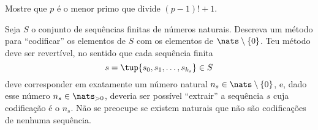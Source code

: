 \begin{exercise}
    Mostre que $p$ \'e o menor primo que divide $(p-1)!+1$.
\end{exercise}

\begin{exercise}
    Seja $S$ o conjunto de sequ\^encias finitas de n\'umeros naturais. Descreva
    um m\'etodo para ``codificar'' os elementos de $S$ com os elementos de
    $\nats\setminus\{0\}$. Teu m\'etodo deve ser revert\'ivel, no sentido que
    cada sequ\^encia finita
    $$
    s = \tup{s_0,s_1,\dots,s_{k_s}} \in S
    $$
    deve corresponder em exatamente um n\'umero natural 
    $n_s\in\nats\setminus\{0\}$, e, dado esse n\'umero $n_s\in\nats_{>0}$, 
    deveria ser poss\'ivel ``extrair'' a sequ\^encia $s$ cuja codificação é o
    $n_s$. Não se preocupe se existem naturais que n\~ao s\~ao 
    codifica{\c c}\~oes de nenhuma sequ\^encia.
\end{exercise}
